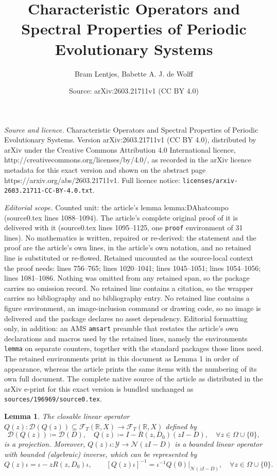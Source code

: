 \documentclass[10pt,a4paper]{amsart}
\title{Characteristic Operators and Spectral Properties of Periodic Evolutionary Systems}
\author{Bram Lentjes, Babette A. J. de Wolff}
\date{Source: arXiv:2603.21711v1 (CC BY 4.0)}
\newtheorem{lemma}{Lemma}
\begin{document}
\maketitle

\noindent\emph{Source and licence.} Characteristic Operators and Spectral Properties of Periodic Evolutionary Systems. Version arXiv:2603.21711v1 (CC BY 4.0), distributed by arXiv under the Creative Commons Attribution 4.0 International licence, http://creativecommons.org/licenses/by/4.0/, as recorded in the arXiv licence metadata for this exact version and shown on the abstract page https://arxiv.org/abs/2603.21711v1. Full licence notice: \texttt{licenses/arxiv-2603.21711-CC-BY-4.0.txt}.\par\smallskip

\noindent\textit{Editorial scope.} Counted unit: the article's lemma lemma:DAhatcompo (source0.tex lines 1088--1094). The article's complete original proof of it is delivered with it (source0.tex lines 1095--1125, one \texttt{proof} environment of 31 lines). No mathematics is written, repaired or re-derived: the statement and the proof are the article's own lines, in the article's own notation, and no retained line is substituted or re-flowed.  Retained uncounted as the source-local context the proof needs: lines 756--765; lines 1020--1041; lines 1045--1051; lines 1054--1056; lines 1081--1086.  Nothing was omitted from any retained span, so the package carries no omission record.  No retained line contains a citation, so the wrapper carries no bibliography and no bibliography entry.  No retained line contains a figure environment, an image-inclusion command or drawing code, so no image is delivered and the package declares no asset dependency.  Editorial formatting only, in addition: an AMS \texttt{amsart} preamble that restates the article's own declarations and macros used by the retained lines, namely the environments \texttt{lemma} on separate counters, together with the standard packages those lines need.  The retained environments print in this document as Lemma 1 in order of appearance, whereas the article prints the same items with the numbering of its own full document.  The complete native source of the article as distributed in the arXiv e-print for this exact version is bundled unchanged as \texttt{sources/196969/source0.tex}.
\begin{lemma} \label{lemma:Q(z)closable}
The closable linear operator $Q(z) : \mathcal{D}(Q(z)) \subseteq \mathcal{F}_T(\mathbb{R},X) \to \mathcal{F}_T(\mathbb{R},X)$ defined by
\begin{equation} \label{eq:actionQ}
    \mathcal{D}(Q(z)) \coloneqq \mathcal{D}(D), \quad Q(z) \coloneqq I - R(z,D_0)(zI - D), \quad \forall z \in \Omega \cup \{0\},
\end{equation}
is a projection. Moreover, $Q(z) \iota: \mathcal{Y} \to \mathcal{N}(zI-D)$ is a bounded linear operator with bounded (algebraic) inverse, which can be represented by
\begin{equation} \label{eq:Q(z)iota}
    Q(z)\iota = \iota - zR(z,D_0)\iota, \qquad [Q(z)\iota]^{-1} = \iota^{-1} Q(0) |_{\mathcal{N}(zI-D)}, \quad \forall z \in \Omega \cup \{0\}.
\end{equation}
\end{lemma}
\end{document}
